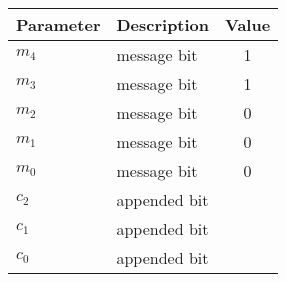 \begin{tabular}{|l|l|c|}
\hline
\textbf{Parameter} & \textbf{Description} & \textbf{Value} \\
\hline
$m_4$ & message bit & 1 \\
\hline
$m_3$ & message bit & 1 \\
\hline
$m_2$ & message bit & 0 \\
\hline
$m_1$ & message bit & 0 \\
\hline
$m_0$ & message bit & 0 \\
\hline
$c_2$ & appended bit &  \\
\hline
$c_1$ & appended bit &  \\
\hline
$c_0$ & appended bit &  \\
\hline
\end{tabular}
